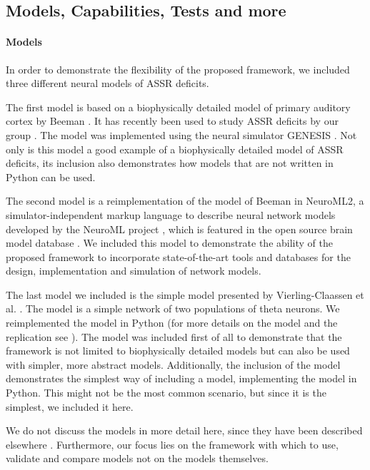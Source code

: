 \documentclass[a4paper,10pt]{article}
\begin{document}
\subsection{Models, Capabilities, Tests and more}



\paragraph{Models}
In order to demonstrate the flexibility of the proposed framework, we included three different neural models of ASSR deficits.

The first model is based on a biophysically detailed model of primary auditory cortex by Beeman \cite{Beeman2013}. It has recently been used to study 
ASSR deficits by our group \cite{Metzner2016}. The model was implemented using the neural simulator GENESIS \cite{Bower1992,Bower1998}. Not only is this model
a good example of a biophysically detailed model of ASSR deficits, its inclusion also demonstrates how models that are not written in Python can be used.

The second model is a reimplementation of the model of Beeman in NeuroML2, a simulator-independent markup language to describe neural network models developed by the
NeuroML project \cite{Cannon2014}, which is featured in the open source brain model database \cite{Gleeson2012}. We included this model to demonstrate the ability of the proposed framework
to incorporate state-of-the-art tools and databases for the design, implementation and simulation of network models.

The last model we included is the simple model presented by Vierling-Claassen et al. \cite{Vierling2008}. The model is a simple network of two populations of theta neurons. 
We reimplemented the model in Python (for more details on the model and the replication see \cite{Metzner2017}).
The model
was included first of all to demonstrate that the framework is not limited to biophysically detailed models but can also be used with simpler, more abstract models.
Additionally, the inclusion of the model demonstrates the simplest way of including a model, implementing the model in Python. This might not be the most common scenario, but 
since it is the simplest, we included it here.

We do not discuss the models in more detail here, since they have been described elsewhere \cite{Beeman2013,Metzner2016,Vierling2008,Metzner2017}. Furthermore, our focus lies on the framework with which to use, validate and compare
models not on the models themselves.
\end{document}
